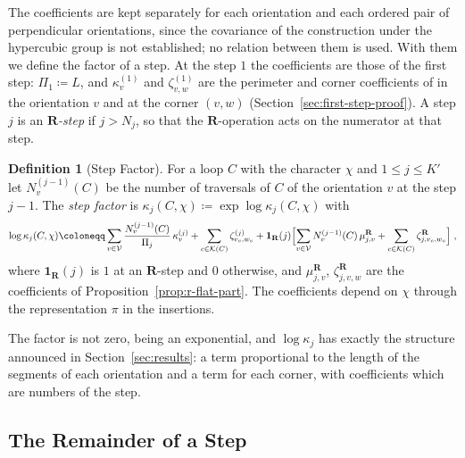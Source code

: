 \documentclass[11pt]{preprint}
\numberwithin{equation}{section}
\theoremstyle{definition}
\newtheorem{definition}[theorem]{Definition}
\theoremstyle{remark}
\theoremstyle{plain}
\begin{document}
The coefficients are kept separately for each orientation and each ordered pair of perpendicular orientations, since the covariance of the construction under the hypercubic group is not established; no relation between them is used. With them we define the factor of a step. At the step $1$ the coefficients are those of the first step: $\Pi_1 \coloneqq L$, and $\kappa^{(1)}_v$ and $\zeta^{(1)}_{v,w}$ are the perimeter and corner coefficients of \cite[(5.33), (6.4)]{WilsonFirstStep} in the orientation $v$ and at the corner $(v, w)$ (Section~\ref{sec:first-step-proof}). A step $j$ is an \emph{$\mathbf R$-step} if $j > N_j$, so that the $\mathbf R$-operation acts on the numerator at that step.

\begin{definition}[Step Factor]\label{def:step-factor}
For a loop $C$ with the character $\chi$ and $1 \leq j \leq K'$ let $N^{(j-1)}_v(C)$ be the number of traversals of $C$ of the orientation $v$ at the step $j - 1$. The \emph{step factor} is $\kappa_j(C, \chi) \coloneqq \exp\log\kappa_j(C, \chi)$ with
\begin{equation}\label{eq:step-factor}
    \log\kappa_j(C, \chi) \coloneqq \sum_{v \in \mathcal V}\frac{N^{(j-1)}_v(C)}{\Pi_j}\,\kappa^{(j)}_v + \sum_{c \in \mathcal K(C)}\zeta^{(j)}_{v_c,w_c} + \mathbf 1_{\mathbf R}(j)\Bigl[\sum_{v \in \mathcal V}N^{(j-1)}_v(C)\,\mu^{\mathbf R}_{j,v} + \sum_{c \in \mathcal K(C)}\zeta^{\mathbf R}_{j,v_c,w_c}\Bigr]\;,
\end{equation}
where $\mathbf 1_{\mathbf R}(j)$ is $1$ at an $\mathbf R$-step and $0$ otherwise, and $\mu^{\mathbf R}_{j,v}$, $\zeta^{\mathbf R}_{j,v,w}$ are the coefficients of Proposition~\ref{prop:r-flat-part}. The coefficients depend on $\chi$ through the representation $\pi$ in the insertions.
\end{definition}

The factor is not zero, being an exponential, and $\log\kappa_j$ has exactly the structure announced in Section~\ref{sec:results}: a term proportional to the length of the segments of each orientation and a term for each corner, with coefficients which are numbers of the step.

\subsection{The Remainder of a Step}\label{sec:flat-remainder}
\end{document}
